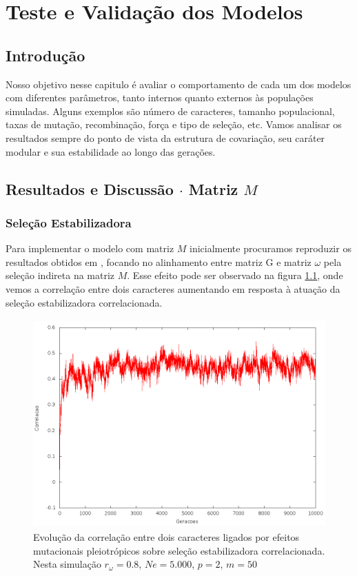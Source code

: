 \pagestyle{empty}
\cleardoublepage
\pagestyle{fancy}
\chapter{Teste e Validação dos Modelos}\label{cap3}

\section{Introdução}

Nosso objetivo nesse capitulo é avaliar o comportamento de cada um dos
modelos com diferentes parâmetros, tanto internos quanto
externos às populações simuladas.
Alguns exemplos são número de caracteres, tamanho populacional, taxas de
mutação, recombinação, força e tipo de seleção, etc. 
Vamos analisar os resultados sempre do ponto de vista da estrutura de
covariação, seu caráter modular e sua estabilidade ao longo das
gerações.


\section{Resultados e Discussão $\cdot$ Matriz $M$}\label{cap3:ModelM}

\subsection{Seleção Estabilizadora}

Para implementar o modelo com matriz $M$ inicialmente procuramos
reproduzir os resultados obtidos em \cite{Jones2007}, focando no
alinhamento entre matriz G e matriz $\omega$ pela seleção indireta na
matriz $M$. 
Esse efeito pode ser observado na figura \ref{jones2tracos}, onde vemos
a correlação entre dois caracteres aumentando em resposta à atuação da
seleção estabilizadora correlacionada.  

\begin{figure}[htbp]
    \centering
    \includegraphics[width=150mm, height=80mm]{figuras/jones2tracos.png}
    \caption{Evolução da correlação entre dois caracteres ligados por efeitos
        mutacionais pleiotrópicos sobre seleção estabilizadora correlacionada.
    Nesta simulação $r_\omega=0.8$, $Ne=5.000$, $p=2$, $m=50$}
    \label{jones2tracos}
\end{figure}


